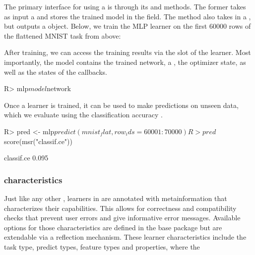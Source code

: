 \documentclass[article]{jss}
\theoremstyle{definition}
\begin{document}
The primary interface for using a  is through its  and  methods.
The former takes as input a  and stores the trained model in the  field.
The  method also takes in a , but outputs a  object.
Below, we train the MLP learner on the first 60000 rows of the flattened MNIST task from above:


After training, we can access the training results via the  slot of the learner.
Most importantly, the model contains the trained network, a , the optimizer state, as well as the states of the callbacks.

\begin{CodeInput}
R> mlp$model$network
\end{CodeInput}

Once a learner is trained, it can be used to make predictions on unseen data, which we evaluate using the classification accuracy .

\begin{CodeInput}
R> pred <- mlp$predict(mnist_flat, row_ids = 60001:70000)
R> pred$score(msr("classif.ce"))
\end{CodeInput}

\begin{CodeOutput}
classif.ce
     0.095
\end{CodeOutput}

\subsubsection[Learner characteristics]{ characteristics}\label{sec:learner-characteristics}

Just like any other , learners in  are annotated with metainformation that characterizes their capabilities.
This allows for correctness and compatibility checks that prevent user errors and give informative error messages.
Available options for those characteristics are defined in the  base package but are extendable via a reflection mechanism.
These learner characteristics include the task type, predict types, feature types and properties, where the
\end{document}
